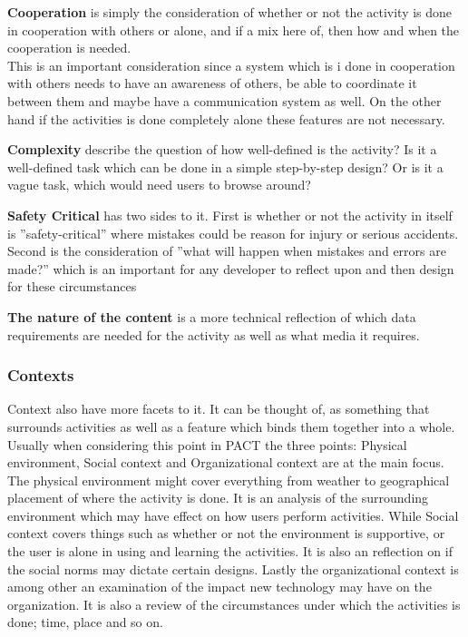 \textbf{Cooperation} is simply the consideration of whether or not the activity is done in cooperation with others or alone, and if a mix here of, then how and when the cooperation is needed.
\\\indent
This is an important consideration since a system which is i done in cooperation with others needs to have an awareness of others, be able to coordinate it between them and maybe have a communication system as well.
On the other hand if the activities is done completely alone these features are not necessary. 

\textbf{Complexity} describe the question of how well-defined is the activity?
Is it a well-defined task which can be done in a simple step-by-step design?
Or is it a vague task, which would need users to browse around?

\textbf{Safety Critical} has two sides to it.
First is whether or not the activity in itself is ''safety-critical'' where mistakes could be reason for injury or serious accidents.
Second is the consideration of ''what will happen when mistakes and errors are made?'' which is an important for any developer to reflect upon and then design for these circumstances

\textbf{The nature of the content} is a more technical reflection of which data requirements are needed for the activity as well as what media it requires.

\subsubsection{Contexts}
Context also have more facets to it.
It can be thought of, as something that surrounds activities as well as a feature which binds them together into a whole.
Usually when considering this point in PACT the three points: Physical environment, Social context and Organizational context are at the main focus.
\\\indent
The physical environment might cover everything from weather to geographical placement of where the activity is done. 
It is an analysis of the surrounding environment which may have effect on how users perform activities.
While Social context covers things such as whether or not the environment is supportive, or the user is alone in using and learning the activities. 
It is also an reflection on if the social norms may dictate certain designs.
Lastly the organizational context is among other an examination of the impact new technology may have on the organization. 
It is also a review of the circumstances under which the activities is done; time, place and so on.

